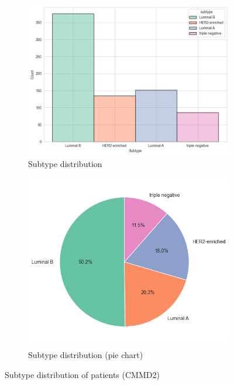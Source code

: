\documentclass[a4paper,10pt]{book}
\begin{document}
\begin{figure}[h!]
	\centering
	\begin{subfigure}[c]{0.45\textwidth}
		\centering
		\includegraphics[width=\textwidth]{reports//assets/subtype_hist.png}
		\caption{Subtype distribution}
		\label{fig:subtype_hist}
	\end{subfigure}
	\begin{subfigure}[c]{0.45\textwidth}
		\centering
		\includegraphics[width=\textwidth]{reports/assets/subtype_pie.png}
		\caption{Subtype distribution (pie chart)}
		\label{fig:subtype_pie}
	\end{subfigure}
	\caption[CMMD2 molecular subtypes distribution]{Subtype distribution of patients (CMMD2)}
	\label{fig:subtype_charts}
\end{figure}
\end{document}

